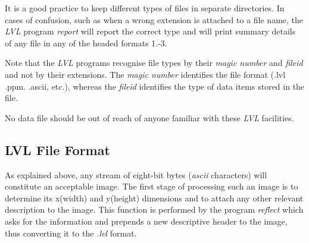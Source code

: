 \documentclass[11pt,twoside,english,a4paper]{article}
\begin{document}
It is a good practice to keep different types of files in separate
directories. In cases of confusion, such
as when a wrong extension is attached to a file name, the \emph{LVL} program \emph{report}
will report the correct type and will print summary details of any
file in any of the headed formats 1.-3. 

Note that the \emph{LVL} programs recognise
file types by their \emph{magic number} and \emph{fileid} and not by their extensions.
The \emph{magic number} identifies the file format (.lvl .ppm. .ascii, etc.),
whereas the \emph{fileid} identifies the type of data items stored in the file.

No data file should be out of reach of anyone familiar with these \emph{LVL} facilities.

\subsection{LVL File Format}
As explained above, any stream of eight-bit bytes (\emph{ascii} characters)
will constitute an acceptable image. The first stage of processing
such an image is to determine its x(width) and y(height) dimensions
and to attach any other relevant description to the image. This function
is performed by the program \textit{reflect} which asks for the information and 
prepends a new descriptive header to the image, thus converting it to the \emph{.lvl} format.
\end{document}
